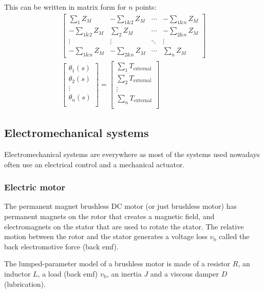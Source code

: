\documentclass[10pt, twocolumn]{article}
\begin{document}
This can be written in matrix form for \(n\) points:
\begin{multline*}
  \begin{bmatrix}
    \sum_1 {Z_M}       & - \sum_{1\&2}{Z_M} & \cdots & - \sum_{1\&n}{Z_M} \\
    - \sum_{1\&2}{Z_M} & \sum_2 {Z_M}       & \cdots & - \sum_{2\&n}{Z_M} \\
    \vdots             & \vdots             & \ddots & \vdots             \\
    - \sum_{1\&n}{Z_M} & -\sum_{2\&n}{Z_M}  & \cdots & \sum_n{Z_M}
  \end{bmatrix} \\
  \begin{bmatrix}
    \theta_1(s) \\
    \theta_2(s) \\
    \vdots      \\
    \theta_n(s) \\
  \end{bmatrix}
  =
  \begin{bmatrix}
    \sum_1{T_\text{external}} \\
    \sum_2{T_\text{external}} \\
    \vdots                    \\
    \sum_n{T_\text{external}} \\
  \end{bmatrix}
\end{multline*}


\subsection{Electromechanical systems}
Electromechanical systems are everywhere as most of the systems used nowadays often use an electrical control and a mechanical actuator.


\subsubsection{Electric motor}
The permanent magnet brushless DC motor (or just brushless motor) has permanent magnets on the rotor that creates a magnetic field, and electromagnets on the stator that are used to rotate the stator.
The relative motion between the rotor and the stator generates a voltage loss \(v_\mathrm{b}\) called the back electromotive force (back emf).

The lumped-parameter model of a brushless motor is made of a resistor \(R\), an inductor \(L\), a load (back emf) \(v_\mathrm{b}\), an inertia \(J\) and a viscous damper \(D\) (lubrication).
\end{document}
